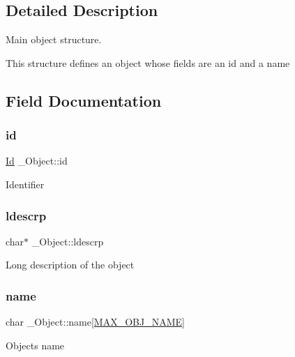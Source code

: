 \subsection{Detailed Description}
Main object structure. 

This structure defines an object whose fields are an id and a name 

\subsection{Field Documentation}
\mbox{\label{struct__Object_a3cff7a0e8dc4e9d23895ed9af1b7653a}} 
\subsubsection{\texorpdfstring{id}{id}}
{\footnotesize\ttfamily \hyperlink{types_8h_a845e604fb28f7e3d97549da3448149d3}{Id} \+\_\+\+Object\+::id}

Identifier \mbox{\label{struct__Object_ab2d033c018fbe2639c88561e55306832}} 
\subsubsection{\texorpdfstring{ldescrp}{ldescrp}}
{\footnotesize\ttfamily char$\ast$ \+\_\+\+Object\+::ldescrp}

Long description of the object \mbox{\label{struct__Object_a59556463a256cec309077768589f10a8}} 
\subsubsection{\texorpdfstring{name}{name}}
{\footnotesize\ttfamily char \+\_\+\+Object\+::name\mbox{[}\hyperlink{object_8h_a6a2f391825e94d06a3137b75abfa1bba}{M\+A\+X\+\_\+\+O\+B\+J\+\_\+\+N\+A\+ME}\mbox{]}}

Object\textquotesingle{}s name \mbox{\label{struct__Object_affa493ad8fdeafe924950f7388356a55}} 
